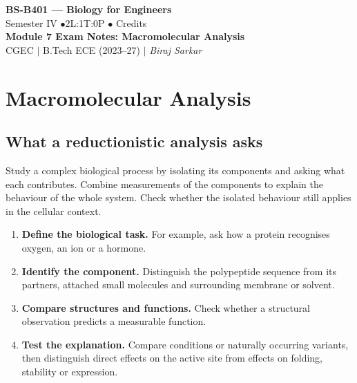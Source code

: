\documentclass[12pt,a4paper]{article}
\begin{document}
\begin{center}
  {\LARGE\bfseries\color{myred} BS-B401 --- Biology for Engineers}\\[5pt]
  {\normalsize\color{mydark} Semester IV \quad$\bullet$\quad 2L:1T:0P \quad$\bullet$ Credits}\\[3pt]
  {\normalsize\color{myteal}\textbf{Module 7 Exam Notes: Macromolecular Analysis}}\\[3pt]
  {\small\color{mydark} CGEC \;$|$\; B.Tech ECE (2023--27) \;$|$\; \textit{Biraj Sarkar}}
\end{center}
\vspace{2pt}
\noindent{\color{myred}\rule{\linewidth}{1.5pt}}
\vspace{2pt}

\hypersetup{linkcolor=mydark}
\tableofcontents
\hypersetup{linkcolor=myteal}
\newpage

\section{Macromolecular Analysis}
\subsection{What a reductionistic analysis asks}
\begin{tcolorbox}[defbox, title={Reductionistic analysis}]
Study a complex biological process by isolating its components and asking what each contributes. Combine measurements of the components to explain the behaviour of the whole system. Check whether the isolated behaviour still applies in the cellular context.
\end{tcolorbox}

\begin{enumerate}[leftmargin=*, itemsep=3pt, topsep=4pt]
  \item \textbf{Define the biological task.} For example, ask how a protein recognises oxygen, an ion or a hormone.
  \item \textbf{Identify the component.} Distinguish the polypeptide sequence from its partners, attached small molecules and surrounding membrane or solvent.
  \item \textbf{Compare structures and functions.} Check whether a structural observation predicts a measurable function.
  \item \textbf{Test the explanation.} Compare conditions or naturally occurring variants, then distinguish direct effects on the active site from effects on folding, stability or expression.
\end{enumerate}
\end{document}
